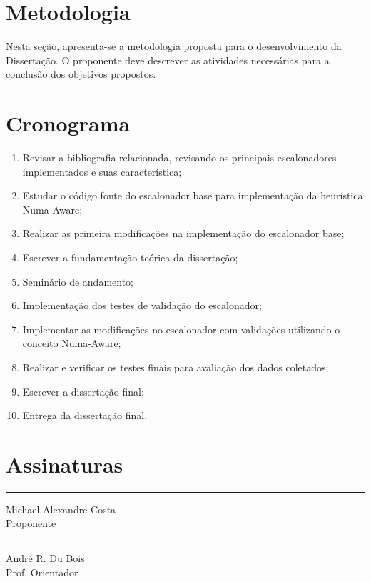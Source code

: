 \documentclass[diss-proposta,nocipinfo]{texufpel}
\begin{document}
\chapter{Metodologia}

Nesta seção, apresenta-se a metodologia proposta para o
desenvolvimento da Dissertação. O proponente deve descrever as
atividades necessárias para a conclusão dos objetivos propostos.

\chapter{Cronograma}

\begin{enumerate}
  \item Revisar a bibliografia relacionada, revisando os principais escalonadores implementados e suas característica;
  \item Estudar o código fonte do escalonador base para implementação da heurística Numa-Aware;
  \item Realizar as primeira modificações na implementação do escalonador base;
  \item Escrever a fundamentação teórica da dissertação;
  \item Seminário de andamento;
  \item Implementação dos testes de validação do escalonador;
  \item Implementar as modificações no escalonador com validações utilizando o conceito Numa-Aware;
  \item Realizar e verificar os testes finais para avaliação dos dados coletados;
  \item Escrever a dissertação final;
  \item Entrega da dissertação final.
\end{enumerate}






\chapter{Assinaturas}
\vspace{2cm}

\begin{center}
\rule{8cm}{.3mm}
\medskip

	Michael Alexandre Costa\\
	Proponente

\end{center}

\vspace{4cm}

\begin{center}
\rule{8cm}{.3mm}
\medskip

	André R. Du Bois\\
	Prof. Orientador

\end{center}
\end{document}
